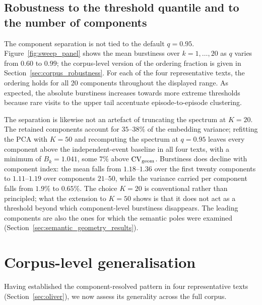 \documentclass[preprint]{elsarticle}
\newcommand{\CV}{\mathrm{CV}}
\newcommand{\NOTE}[1]{\textcolor{blue}{\textbf{[NOTE: #1]}}}
\begin{document}
\FloatBarrier
\subsection{Robustness to the threshold quantile and to the number of
components}
\label{sec:single_text_robustness}

The component separation is not tied to the default $q=0.95$.
Figure~\ref{fig:sweep_panel} shows the mean
burstiness over $k=1,\ldots,20$ as $q$ varies from $0.60$ to $0.99$;
the corpus-level version of the ordering fraction is given in
Section~\ref{sec:corpus_robustness}.
For each of the four representative texts, the ordering holds for all
20 components throughout the displayed range. As expected, the
absolute burstiness increases towards more extreme thresholds because
rare visits to the upper tail accentuate episode-to-episode clustering.


The separation is likewise not an artefact of truncating the spectrum at
$K=20$. 
The retained components account for $35$--$38\%$ of the embedding
variance; refitting the PCA with $K=50$ and recomputing the spectrum at
$q=0.95$ leaves every component above the independent-event baseline in
all four texts, with a minimum of $B_k=1.041$, some $7\%$ above
$\CV_{\rm geom}$. Burstiness does decline with component index: the mean
falls from $1.18$--$1.36$ over the first twenty components to
$1.11$--$1.19$ over components $21$--$50$, while the variance carried per
component falls from $1.9\%$ to $0.65\%$. 
The choice $K=20$ is conventional rather than principled; what the
extension to $K=50$ shows is that it does not act as a threshold beyond
which component-level burstiness disappears. The leading components are
also the ones for which the semantic poles were examined
(Section~\ref{sec:semantic_geometry_results}).

\FloatBarrier
\section{Corpus-level generalisation}
\label{sec:corpus}

Having established the component-resolved pattern in four
representative texts (Section~\ref{sec:oliver}), we now assess its
generality across the full corpus.
%
\end{document}
